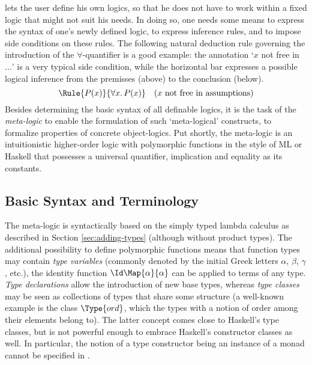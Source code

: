 \Isabelle lets the user define his own logics, so that he does not have to work
within a fixed logic that might not suit his needs. In doing so, one needs some
means to express the syntax of one's newly defined logic, to express inference
rules, and to impose side conditions on these rules. The following natural
deduction rule governing the introduction of the $\forall$-quantifier is a good
example: the annotation `$x$ not free in $\ldots$' is a very typical side condition,
while the horizontal bar expresses a possible logical inference from the
premisses (above) to the conclusion (below).
\begin{equation}
  \Rule{P(x)}{\forall x.\,P(x)} \quad \text{($x$ not free in assumptions)}
\end{equation}
Besides determining the basic syntax of all definable logics, it is the task of
the \emph{meta-logic} to enable the formulation of such `meta-logical'
constructs, \IE to formalize properties of concrete object-logics. Put shortly,
the meta-logic is an intuitionistic higher-order logic with polymorphic
functions in the style of ML or Haskell that possesses a universal quantifier,
implication and equality as its constants.


\subsection{Basic Syntax and Terminology}
\label{sec:meta-basic-syntax}

The meta-logic is syntactically based on the simply typed lambda calculus as
described in Section \ref{sec:adding-types} (although without product types).
The additional possibility to define polymorphic functions means that function
types may contain \emph{type variables} (commonly denoted by the initial Greek
letters $\alpha$, $\beta$, $\gamma$, etc.), \EG the identity function $\Id \Map{\alpha}{\alpha}$ can be
applied to terms of any type.  \emph{Type declarations} allow the introduction
of new base types, whereas \emph{type classes} may be seen as collections of
types that share some structure (a well-known example is the class $\Type{ord}$,
which the types with a notion of order among their elements belong to). The
latter concept comes close to Haskell's type classes, but is not powerful enough
to embrace Haskell's constructor classes as well. In particular, the notion of a
type constructor being an instance of a monad cannot be specified in \Isabelle.

